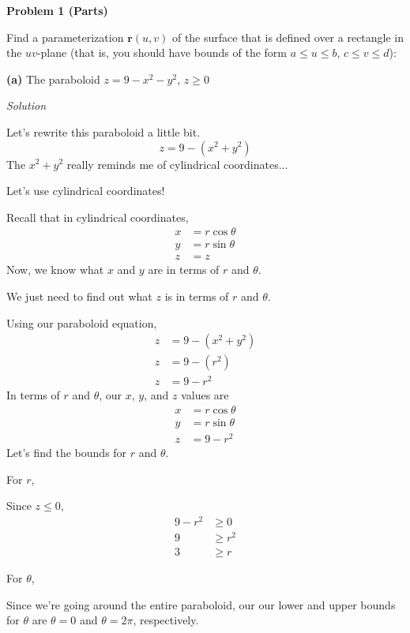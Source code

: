 \documentclass{article}
\renewcommand{\r}[0]{\mathbf{r}}
\newcommand{\Solution}{\textit{Solution}}
\begin{document}
{}\textbf{Problem 1 (Parts)}

Find a parameterization $\r(u,v)$ of the surface that is defined over a rectangle in the $uv$-plane (that is, you should have bounds of the form $a\leq u\leq b$, $c\leq v\leq d$):

{}\textbf{(a)} The paraboloid $z=9-x^2-y^2$, $z\geq 0$

\Solution

Let's rewrite this paraboloid a little bit.
\begin{equation*}
    z=9-(x^2+y^2)
\end{equation*}
The $x^2+y^2$ really reminds me of cylindrical coordinates...

Let's use cylindrical coordinates!

Recall that in cylindrical coordinates,
\begin{align*}
    x&=r\cos \theta\\
    y&=r\sin \theta\\
    z&=z
\end{align*}
Now, we know what $x$ and $y$ are in terms of $r$ and $\theta$.

We just need to find out what $z$ is in terms of $r$ and $\theta$.

Using our paraboloid equation,
\begin{align*}
    z&=9-(x^2+y^2)\\
    z&=9-(r^2)\tag{in polar, $x^2+y^2=r^2$}\\
    z&=9-r^2
\end{align*}
In terms of $r$ and $\theta$, our $x$, $y$, and $z$ values are
\begin{align*}
    x&=r\cos \theta\\
    y&=r\sin \theta\\
    z&=9-r^2
\end{align*}
Let's find the bounds for $r$ and $\theta$.

For $r$,

Since $z\leq 0$,
\begin{align*}
    9-r^2&\geq 0\\
    9 &\geq r^2\\
    3&\geq r\tag{$r\geq 0$ is always true}
\end{align*}

For $\theta$,

Since we're going around the entire paraboloid, our our lower and upper bounds for $\theta$ are $\theta=0$ and $\theta=2\pi$, respectively.
\end{document}
